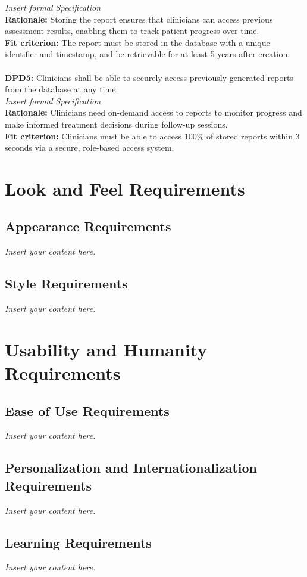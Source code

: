 \documentclass[12pt]{article}
\newcommand{\lips}{\textit{Insert your content here.}}
\begin{document}
\textit{Insert formal Specification}\\
\textbf{Rationale: }Storing the report ensures that clinicians can access previous assessment results, enabling them to track patient progress over time.\\
\textbf{Fit criterion: } The report must be stored in the database with a unique identifier and timestamp, and be retrievable for at least 5 years after creation.\\
\\
\noindent\textbf{DPD5: }Clinicians shall be able to securely access previously generated reports from the database at any time.\\
\textit{Insert formal Specification}\\
\textbf{Rationale: }Clinicians need on-demand access to reports to monitor progress and make informed treatment decisions during follow-up sessions.\\
\textbf{Fit criterion: }Clinicians must be able to access 100\% of stored reports within 3 seconds via a secure, role-based access system.\\

\section{Look and Feel Requirements}
\subsection{Appearance Requirements}
\lips
\subsection{Style Requirements}
\lips

\section{Usability and Humanity Requirements}
\subsection{Ease of Use Requirements}
\lips
\subsection{Personalization and Internationalization Requirements}
\lips
\subsection{Learning Requirements}
\lips
\end{document}
